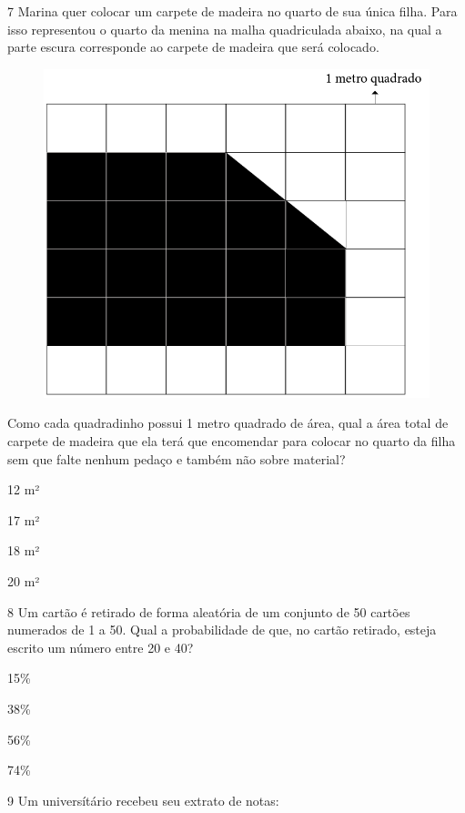 \num{7} Marina quer colocar um carpete de madeira no quarto de sua única
filha. Para isso representou o quarto da menina na malha quadriculada
abaixo, na qual a parte escura corresponde ao carpete de madeira que será
colocado.

\begin{figure}[htpb!]
\centering
\includegraphics[width=.5\textwidth]{../ilustracoes/MAT5/SAEB_5ANO_MAT_figura122.png}
\end{figure}

Como cada quadradinho possui 1 metro quadrado de área, qual a área total
de carpete de madeira que ela terá que encomendar para colocar no quarto
da filha sem que falte nenhum pedaço e também não sobre material?\bigskip

\begin{minipage}{.5\textwidth}
\begin{escolha}
\item
  12 m²
\item
  17 m²
\item
  18 m²
\item
  20 m²
\end{escolha}
\end{minipage}


\pagebreak
\num{8} Um cartão é retirado de forma aleatória de um conjunto de 50
cartões numerados de 1 a 50. Qual a probabilidade de que, no cartão
retirado, esteja escrito um número entre 20 e 40?

\begin{minipage}{.5\textwidth}
\begin{escolha}
\item
  15\%
\item
  38\%
\item
  56\%
\item
  74\%
\end{escolha}
\end{minipage}


\num{9} Um universítário recebeu seu extrato de notas:

